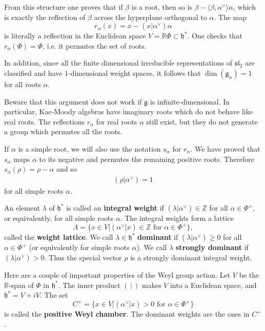 \documentclass[12pt]{article}
\begin{document}
\begin{remark}
    From this structure one proves that if $\beta$ is a root, then so is $\beta - \langle \beta,\alpha^\vee \rangle \alpha$, which is exactly the reflection of $\beta$ across the hyperplane orthogonal to $\alpha$. The map
    \[
        r_\alpha(x) = x - (x|\alpha^\vee)\alpha
    \]
    is literally a reflection in the Euclidean space $V = \mathbb{R}\Phi \subset \mathfrak{h}^*$.
    One checks that $r_\alpha(\Phi) = \Phi$, i.e. it permutes the set of roots.

    In addition, since all the finite dimensional irreducible representations of $\mathfrak{sl}_2$ are classified and have $1$-dimensional weight spaces, it follows that $\dim(\mathfrak{g}_\alpha) = 1$ for all roots $\alpha$.

    Beware that this argument does not work if $\mathfrak{g}$ is infinite-dimensional. In particular, Kac-Moody algebras have imaginary roots which do not behave like real roots. The reflections $r_\alpha$ for real roots $\alpha$ still exist, but they do not generate a group which permutes all the roots.

\end{remark}

If $\alpha$ is a simple root, we will also use the notation $s_\alpha$ for $r_\alpha$. We have proved that $s_\alpha$ maps $\alpha$ to its negative and permutes the remaining positive roots. Therefore $s_\alpha(\rho) = \rho - \alpha$ and so
\begin{align*}
    (\rho|\alpha^\vee) = 1
\end{align*}
for all simple roots $\alpha$.

An element $\lambda$ of $\mathfrak{h}^*$ is called an \textbf{integral weight} if $(\lambda|\alpha^\vee) \in \mathbb{Z}$ for all $\alpha \in \Phi^+$, or equivalently, for all simple roots $\alpha$. The integral weights form a lattice
\[
    \Lambda = \{x \in V | (\alpha^\vee|x) \in \mathbb{Z} \text{ for } \alpha \in \Phi^+ \},
\]
called the \textbf{weight lattice}. We call $\lambda \in \mathfrak{h}^*$ \textbf{dominant} if $(\lambda|\alpha^\vee) \geq 0$ for all $\alpha \in \Phi^+$ (or equivalently for simple roots $\alpha$). We call $\lambda$ \textbf{strongly dominant} if $(\lambda|\alpha^\vee) > 0$. Thus the special vector $\rho$ is a strongly dominant integral weight.

Here are a couple of important properties of the Weyl group action. Let $V$ be the $\mathbb{R}$-span of $\Phi$ in $\mathfrak{h}^*$. The inner product $(\,|\,)$ makes $V$ into a Euclidean space, and $\mathfrak{h}^* = V + iV$. The set
\[
    C^+ = \{ x \in V | (\alpha^\vee|x) > 0 \text{ for } \alpha \in \Phi^+ \}
\]
is called the \textbf{positive Weyl chamber}. The dominant weights are the ones in $C^+$.
\end{document}
